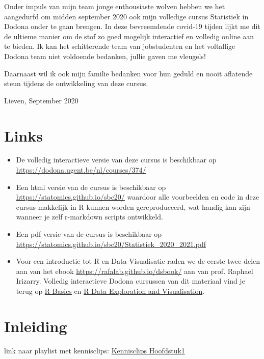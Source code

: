 \documentclass[
  12pt,dutch,coursenotes]{book}
\theoremstyle{definition}
\theoremstyle{definition}
\theoremstyle{definition}
\theoremstyle{remark}
\begin{document}
Onder impuls van mijn team jonge enthousiaste wolven hebben we het aangedurfd om midden september 2020 ook mijn volledige cursus Statistiek in Dodona onder te gaan brengen. In deze bevreemdende covid-19 tijden lijkt me dit de ultieme manier om de stof zo goed mogelijk interactief en volledig online aan te bieden.
Ik kan het schitterende team van jobstudenten en het voltallige Dodona team niet voldoende bedanken, jullie gaven me vleugels!

Daarnaast wil ik ook mijn familie bedanken voor hun geduld en nooit aflatende steun tijdens de ontwikkeling van deze cursus.

Lieven, September 2020

\hypertarget{links}{%
\chapter*{Links}\label{links}}

\begin{itemize}
\item
  De volledig interactieve versie van deze cursus is beschikbaar op \url{https://dodona.ugent.be/nl/courses/374/}
\item
  Een html versie van de cursus is beschikbaar op \url{https://statomics.github.io/sbc20/} waardoor alle voorbeelden en code in deze cursus makkelijk in R kunnen worden gereproduceerd, wat handig kan zijn wanneer je zelf r-markdown scripts ontwikkeld.
\item
  Een pdf versie van de cursus is beschikbaar op \url{https://statomics.github.io/sbc20/Statistiek_2020_2021.pdf}
\item
  Voor een introductie tot R en Data Visualisatie raden we de eerste twee delen aan van het ebook \url{https://rafalab.github.io/dsbook/} aan van prof. Raphael Irizarry. Volledig interactieve Dodona cursussen van dit materiaal vind je terug op \href{https://dodona.ugent.be/nl/courses/335/}{R Basics} en \href{https://dodona.ugent.be/nl/courses/345/}{R Data Exploration and Visualisation}.
\end{itemize}

\hypertarget{inleiding}{%
\chapter{Inleiding}\label{inleiding}}

link naar playlist met kennisclips:
\href{https://www.youtube.com/playlist?list=PLZH1hP8_LbJIk4G2AZYYKvgZLjRR-1-Iw}{Kennisclips Hoofdstuk1}
\end{document}
